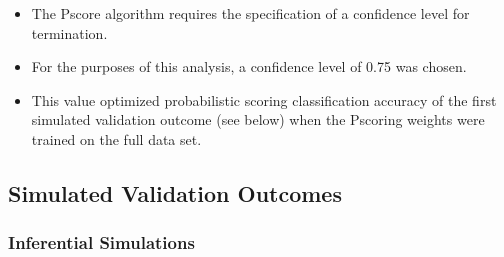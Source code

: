 \documentclass[12pt,]{article}
\providecommand{\tightlist}{%
  \setlength{\itemsep}{0pt}\setlength{\parskip}{0pt}}
\begin{document}
\begin{itemize}
\tightlist
\item
  The Pscore algorithm requires the specification of a confidence level
  for termination.
\item
  For the purposes of this analysis, a confidence level of 0.75 was
  chosen.
\item
  This value optimized probabilistic scoring classification accuracy of
  the first simulated validation outcome (see below) when the Pscoring
  weights were trained on the full data set.
\end{itemize}

\hypertarget{simulated-validation-outcomes}{%
\subsection{Simulated Validation
Outcomes}\label{simulated-validation-outcomes}}

\hypertarget{inferential-simulations}{%
\subsubsection{Inferential Simulations}\label{inferential-simulations}}
\end{document}
